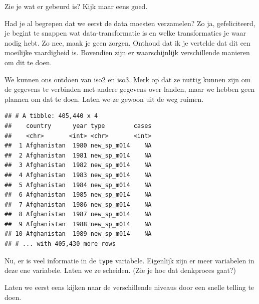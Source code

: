 \documentclass[]{tufte-book}
\newenvironment{Shaded}{}{}
\newcommand{\CommentTok}[1]{\textcolor[rgb]{0.38,0.63,0.69}{\textit{#1}}}
\newcommand{\DataTypeTok}[1]{\textcolor[rgb]{0.56,0.13,0.00}{#1}}
\newcommand{\KeywordTok}[1]{\textcolor[rgb]{0.00,0.44,0.13}{\textbf{#1}}}
\newcommand{\NormalTok}[1]{#1}
\newcommand{\OperatorTok}[1]{\textcolor[rgb]{0.40,0.40,0.40}{#1}}
\newcommand{\OtherTok}[1]{\textcolor[rgb]{0.00,0.44,0.13}{#1}}
\newcommand{\StringTok}[1]{\textcolor[rgb]{0.25,0.44,0.63}{#1}}
\begin{document}
Zie je wat er gebeurd is? Kijk maar eens goed.

Had je al begrepen dat we eerst de data moesten verzamelen? Zo ja, gefeliciteerd, je begint te snappen wat data-transformatie is en welke transformaties je waar nodig hebt. Zo nee, maak je geen zorgen. Onthoud dat ik je vertelde dat dit een moeilijke vaardigheid is. Bovendien zijn er waarschijnlijk verschillende manieren om dit te doen.

We kunnen ons ontdoen van iso2 en iso3. Merk op dat ze nuttig kunnen zijn om de gegevens te verbinden met andere gegevens over landen, maar we hebben geen plannen om dat te doen. Laten we ze gewoon uit de weg ruimen.

\begin{Shaded}
\end{Shaded}

\begin{verbatim}
## # A tibble: 405,440 x 4
##    country      year type        cases
##    <chr>       <int> <chr>       <int>
##  1 Afghanistan  1980 new_sp_m014    NA
##  2 Afghanistan  1981 new_sp_m014    NA
##  3 Afghanistan  1982 new_sp_m014    NA
##  4 Afghanistan  1983 new_sp_m014    NA
##  5 Afghanistan  1984 new_sp_m014    NA
##  6 Afghanistan  1985 new_sp_m014    NA
##  7 Afghanistan  1986 new_sp_m014    NA
##  8 Afghanistan  1987 new_sp_m014    NA
##  9 Afghanistan  1988 new_sp_m014    NA
## 10 Afghanistan  1989 new_sp_m014    NA
## # ... with 405,430 more rows
\end{verbatim}

Nu, er is veel informatie in de \texttt{type} variabele. Eigenlijk zijn er meer variabelen in deze ene variabele. Laten we ze scheiden. (Zie je hoe dat denkproces gaat?)

Laten we eerst eens kijken naar de verschillende niveaus door een snelle telling te doen.

\begin{Shaded}
\end{Shaded}
\end{document}
